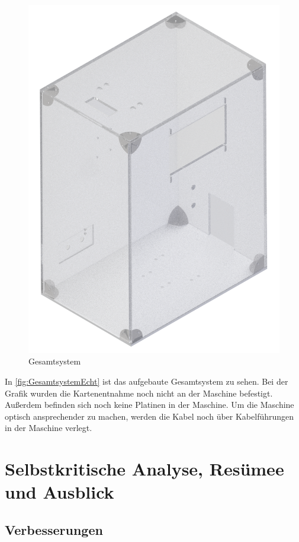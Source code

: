 \begin{figure}[H]
    \centering
    \includegraphics[scale=0.1,page=1]{fig/mech/Gehauuse.png}
    \caption{Gesamtsystem}
    \label{fig:GesamtsystemEcht}
\end{figure}

In \autoref{fig:GesamtsystemEcht} ist das aufgebaute Gesamtsystem zu sehen.
Bei der Grafik wurden die Kartenentnahme noch nicht an der Maschine befestigt.
Außerdem befinden sich noch keine Platinen in der Maschine.
Um die Maschine optisch ansprechender zu machen, werden die Kabel noch über Kabelführungen in der Maschine verlegt.

\section{Selbstkritische Analyse, Resümee und Ausblick}
\subsection{Verbesserungen}

